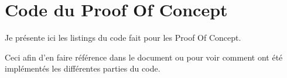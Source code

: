 \chapter{Code du Proof Of Concept}
Je présente ici les listings du code fait pour les Proof Of Concept.

Ceci afin d'en faire référence dans le document ou pour voir comment ont été implémentés les différentes parties du code.

